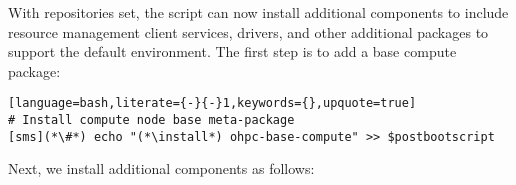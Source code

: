 
With repositories set, the script can now
install additional components to include resource management client services, \InfiniBand{} drivers, and other additional
packages to support the default \OHPC{} environment. The first step is to  add a base compute package:
\begin{lstlisting}[language=bash,literate={-}{-}1,keywords={},upquote=true]
# Install compute node base meta-package
[sms](*\#*) echo "(*\install*) ohpc-base-compute" >> $postbootscript
\end{lstlisting}

\noindent Next, we install additional components as follows:
